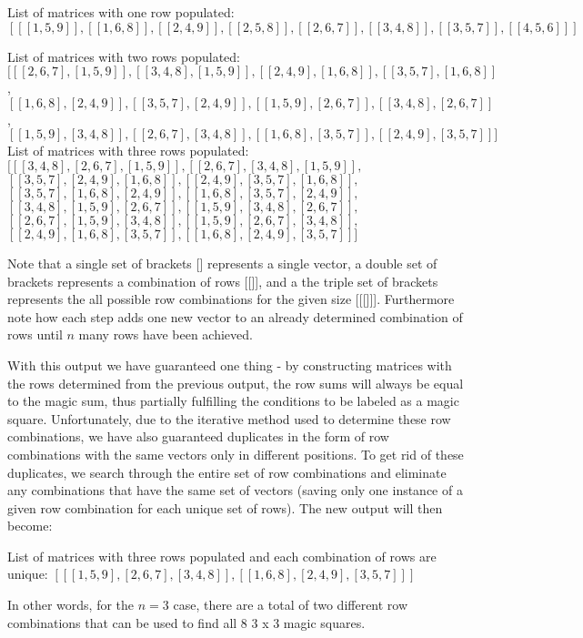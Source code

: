\documentclass{article}
\begin{document}
    \begin{center}
        List of matrices with one row populated:\\$[[[1, 5, 9]], [[1, 6, 8]], [[2, 4, 9]], [[2, 5, 8]], [[2, 6, 7]], [[3, 4, 8]], [[3, 5, 7]], [[4, 5, 6]]]$

        List of matrices with two rows populated:\\$[[[2, 6, 7], [1, 5, 9]], [[3, 4, 8], [1, 5, 9]], [[2, 4, 9], [1, 6, 8]], [[3, 5, 7], [1, 6, 8]]$,\\ 
        $[[1, 6, 8], [2, 4, 9]], [[3, 5, 7], [2, 4, 9]], [[1, 5, 9], [2, 6, 7]], [[3, 4, 8], [2, 6, 7]]$,\\
        $[[1, 5, 9], [3, 4, 8]], [[2, 6, 7], [3, 4, 8]], [[1, 6, 8], [3, 5, 7]], [[2, 4, 9], [3, 5, 7]]]$\\

        List of matrices with three rows populated:\\
        $[[[3, 4, 8], [2, 6, 7], [1, 5, 9]], [[2, 6, 7], [3, 4, 8], [1, 5, 9]],$\\
        $[[3, 5, 7], [2, 4, 9], [1, 6, 8]], [[2, 4, 9], [3, 5, 7], [1, 6, 8]],$\\
        $[[3, 5, 7], [1, 6, 8], [2, 4, 9]], [[1, 6, 8], [3, 5, 7], [2, 4, 9]],$\\
        $[[3, 4, 8], [1, 5, 9], [2, 6, 7]], [[1, 5, 9], [3, 4, 8], [2, 6, 7]],$\\
        $[[2, 6, 7], [1, 5, 9], [3, 4, 8]], [[1, 5, 9], [2, 6, 7], [3, 4, 8]],$\\
        $[[2, 4, 9], [1, 6, 8], [3, 5, 7]], [[1, 6, 8], [2, 4, 9], [3, 5, 7]]]$
    \end{center}
    Note that a single set of brackets [] represents a single vector, a double set of brackets represents a combination of rows [[]], and a the triple set of brackets represents the all possible row combinations for the given size [[[]]]. Furthermore note how each step adds one new vector to an already determined combination of rows until $n$ many rows have been achieved. 
      
    With this output we have guaranteed one thing - by constructing matrices with the rows determined from the previous output, the row sums will always be equal to the magic sum, thus partially fulfilling the conditions to be labeled as a magic square. Unfortunately, due to the iterative method used to determine these row combinations, we have also guaranteed duplicates in the form of row combinations with the same vectors only in different positions. To get rid of these duplicates, we search through the entire set of row combinations and eliminate any combinations that have the same set of vectors (saving only one instance of a given row combination for each unique set of rows). The new output will then become: 
    \begin{center}
        List of matrices with three rows populated and each combination of rows are unique: $[[[1, 5, 9], [2, 6, 7], [3, 4, 8]], [[1, 6, 8], [2, 4, 9], [3, 5, 7]]]$
    \end{center}
    In other words, for the $n = 3$ case, there are a total of two different row combinations that can be used to find all 8 3 x 3 magic squares. 
      
\end{document}

